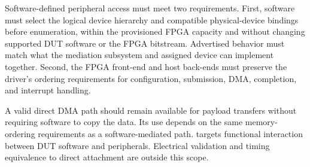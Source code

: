 Software-defined peripheral access must meet two requirements. First,
software must select the logical device hierarchy and compatible
physical-device bindings before enumeration, within the provisioned FPGA
capacity and without changing supported DUT software or the FPGA bitstream.
Advertised behavior must match what the mediation subsystem and assigned
device can implement together. Second, the FPGA front-end and host back-ends
must preserve the driver's ordering requirements for configuration,
submission, DMA, completion, and interrupt handling.

A valid direct DMA path should remain available for payload transfers
without requiring software to copy the data. Its use depends on the same
memory-ordering requirements as a software-mediated path. \sys targets
functional interaction between DUT software and peripherals. Electrical
validation and timing equivalence to direct attachment are outside this scope.
